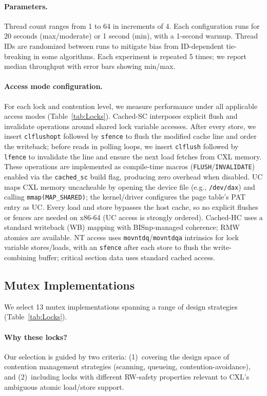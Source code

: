 \paragraph{Parameters.}
Thread count ranges from 1 to 64 in increments of 4.
Each configuration runs for 20 seconds (max/moderate) or 1 second (min), with a 1-second warmup.
Thread IDs are randomized between runs to mitigate bias from ID-dependent tie-breaking in some algorithms.
Each experiment is repeated 5 times; we report median throughput with error bars showing min/max.

\paragraph{Access mode configuration.}
For each lock and contention level, we measure performance under all applicable access modes (Table~\ref{tab:Locks}).
Cached-SC interposes explicit flush and invalidate operations around shared lock variable accesses.
After every store, we insert \texttt{clflushopt} followed by \texttt{sfence} to flush the modified cache line and order the writeback; before reads in polling loops, we insert \texttt{clflush} followed by \texttt{lfence} to invalidate the line and ensure the next load fetches from CXL memory.
These operations are implemented as compile-time macros (\texttt{FLUSH}/\texttt{INVALIDATE}) enabled via the \texttt{cached\_sc} build flag, producing zero overhead when disabled.
UC maps CXL memory uncacheable by opening the device file (e.g., \texttt{/dev/dax}) and calling \texttt{mmap(MAP\_SHARED)}; the kernel/driver configures the page table's PAT entry as UC.
Every load and store bypasses the host cache, so no explicit flushes or fences are needed on x86-64 (UC access is strongly ordered).
Cached-HC uses a standard writeback (WB) mapping with BISnp-managed coherence; RMW atomics are available.
NT access uses \texttt{movntdq}/\texttt{movntdqa} intrinsics for lock variable stores/loads, with an \texttt{sfence} after each store to flush the write-combining buffer; critical section data uses standard cached access.

\subsection{Mutex Implementations}

We select 13 mutex implementations spanning a range of design strategies (Table~\ref{tab:Locks}).

\paragraph{Why these locks?}
Our selection is guided by two criteria: (1)~covering the design space of contention management strategies (scanning, queueing, contention-avoidance), and (2)~including locks with different RW-safety properties relevant to CXL's ambiguous atomic load/store support.

